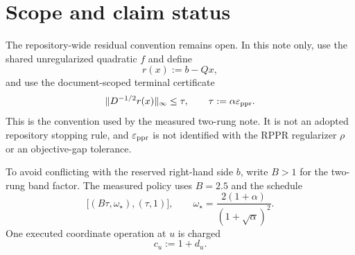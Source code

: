 \section{Scope and claim status}
\label{sec:direct-scope}

The repository-wide residual convention remains open. In this note only, use
the shared unregularized quadratic $f$ and define
\begin{equation}
 r(x):=b-Qx,
 \label{eq:direct-objective-residual}
\end{equation}
and use the document-scoped terminal certificate
\begin{equation}
 \lVert D^{-1/2}r(x)\rVert_\infty\leq\tau,
 \qquad \tau:=\alpha\varepsilon_{\mathrm{ppr}}.
 \label{eq:direct-terminal-gate}
\end{equation}
This is the convention used by the measured two-rung note. It is not an
adopted repository stopping rule, and $\varepsilon_{\mathrm{ppr}}$ is not identified with the
RPPR regularizer $\rho$ or an objective-gap tolerance.

To avoid conflicting with the reserved right-hand side $b$, write $B>1$ for
the two-rung band factor. The measured policy uses $B=2.5$ and the schedule
\begin{equation}
 \bigl[(B\tau,\omega_\star),(\tau,1)\bigr],
 \qquad
 \omega_\star
 =\frac{2(1+\alpha)}{(1+\sqrt\alpha)^2}.
 \label{eq:direct-two-rung-schedule}
\end{equation}
One executed coordinate operation at $u$ is charged
\begin{equation}
 c_u:=1+d_u.
 \label{eq:direct-charge}
\end{equation}

